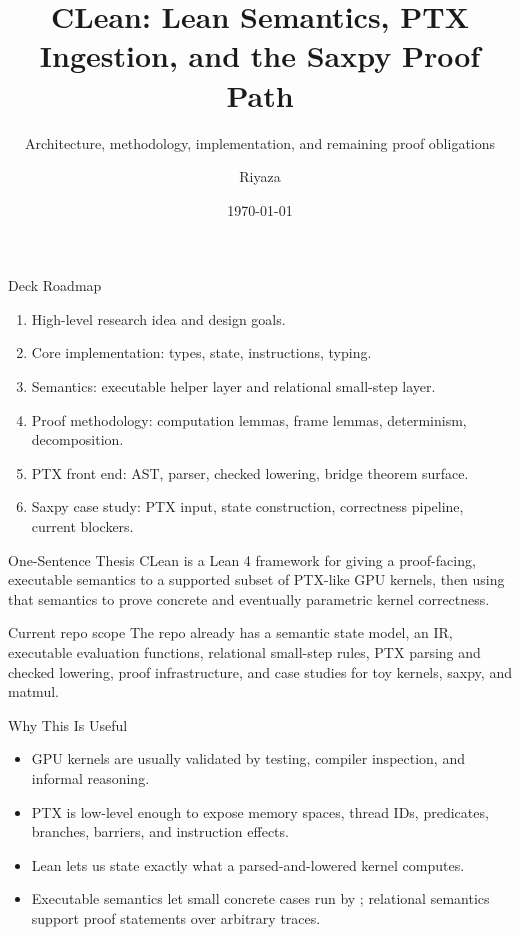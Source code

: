 \documentclass[aspectratio=169,10pt]{beamer}
\title[CLean Advisor Update]{CLean: Lean Semantics, PTX Ingestion, and the Saxpy Proof Path}
\subtitle{Architecture, methodology, implementation, and remaining proof obligations}
\author{Riyaza}
\institute{Technical presentation for PhD advisor}
\date{\today}
\newcommand{\lean}[1]{\texttt{\detokenize{#1}}}
\begin{document}
\begin{frame}
  \titlepage
\end{frame}

\begin{frame}{Deck Roadmap}
  \begin{enumerate}
    \item High-level research idea and design goals.
    \item Core implementation: types, state, instructions, typing.
    \item Semantics: executable helper layer and relational small-step layer.
    \item Proof methodology: computation lemmas, frame lemmas, determinism, decomposition.
    \item PTX front end: AST, parser, checked lowering, bridge theorem surface.
    \item Saxpy case study: PTX input, state construction, correctness pipeline, current blockers.
  \end{enumerate}
\end{frame}

\begin{frame}{One-Sentence Thesis}
  CLean is a Lean 4 framework for giving a proof-facing, executable semantics to a supported subset of PTX-like GPU kernels, then using that semantics to prove concrete and eventually parametric kernel correctness.

  \vspace{1em}
  \begin{block}{Current repo scope}
    The repo already has a semantic state model, an IR, executable evaluation functions, relational small-step rules, PTX parsing and checked lowering, proof infrastructure, and case studies for toy kernels, saxpy, and matmul.
  \end{block}
\end{frame}

\begin{frame}{Why This Is Useful}
  \begin{itemize}
    \item GPU kernels are usually validated by testing, compiler inspection, and informal reasoning.
    \item PTX is low-level enough to expose memory spaces, thread IDs, predicates, branches, barriers, and instruction effects.
    \item Lean lets us state exactly what a parsed-and-lowered kernel computes.
    \item Executable semantics let small concrete cases run by \lean{native_decide}; relational semantics support proof statements over arbitrary traces.
  \end{itemize}
\end{frame}
\end{document}
